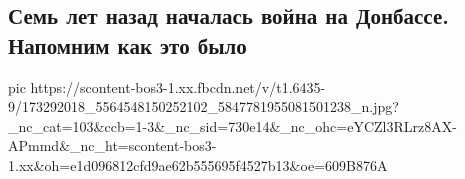  
 
 
 
 

\subsection{Семь лет назад началась война на Донбассе. Напомним как это было}

\ifcmt
  pic https://scontent-bos3-1.xx.fbcdn.net/v/t1.6435-9/173292018_5564548150252102_5847781955081501238_n.jpg?_nc_cat=103&ccb=1-3&_nc_sid=730e14&_nc_ohc=eYCZl3RLrz8AX-APmmd&_nc_ht=scontent-bos3-1.xx&oh=e1d096812cfd9ae62b555695f4527b13&oe=609B876A
\fi

